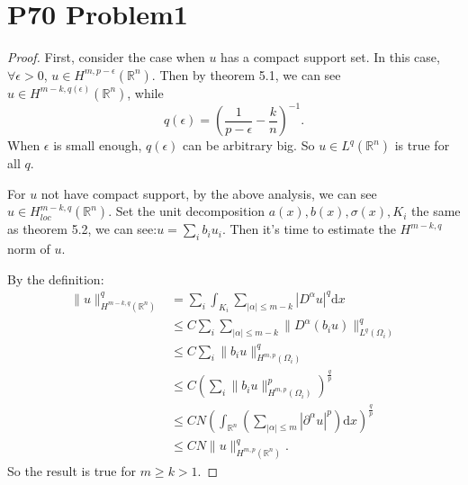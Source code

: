 \documentclass[a4paper]{ctexart}
\newcommand{\dif}{\mathrm{d}}
\begin{document}
\section*{P70 Problem1}
\begin{proof}
    First, consider the case when $u$ has a compact support set. In this case, $\forall\epsilon>0$, $u\in H^{m,p-\epsilon}(\mathbb{R}^{n})$. Then by theorem 5.1, we can see $u\in H^{m-k,q(\epsilon)}(\mathbb{R}^{n})$, while
    \begin{equation}
            q(\epsilon)=(\frac{1}{p-\epsilon}-\frac{k}{n})^{-1}.
    \end{equation}
    When $\epsilon$ is small enough, $q(\epsilon)$ can be arbitrary big. So $u\in L^{q}(\mathbb{R}^{n})$ is true for all $q$.

    For $u$ not have compact support, by the above analysis, we can see $u\in H^{m-k,q}_{loc}(\mathbb{R}^{n})$. Set the unit decomposition $a(x),b(x),\sigma(x),K_{i}$ the same as theorem 5.2, we can see:$u=\sum_{i}b_{i}u_{i}$. Then it's time to estimate the $H^{m-k,q}$ norm of $u$.

    By the definition:
    \begin{equation}
        \begin{aligned}
            \|u\|_{H^{m-k,q}(\mathbb{R}^{n})}^q&=\sum_{i}\int_{K_{i}}\sum_{|\alpha|\le m-k}|D^{\alpha}u|^{q}\dif x\\
            &\le C\sum_{i}\sum_{|\alpha|\le m-k}\|D^{\alpha}(b_{i}u)\|_{L^{q}(\Omega_{i})}^{q}\\
            &\le C\sum_{i}\|b_{i}u\|_{H^{m,p}(\Omega_{i})}^{q}\\
            &\le C\left(\sum_{i}\|b_{i}u\|_{H^{m,p}(\Omega_{i})}^{p}\right)^{\frac{q}{p}}\\
            &\le CN\left(\int_{\mathbb{R}^{n}}\left(\sum_{|\alpha|\le m}|\partial^{\alpha}u|^{p}\right)\dif x\right)^{\frac{q}{p}}\\
            &\le CN\|u\|_{H^{m,p}(\mathbb{R}^{n})}^{q}.
        \end{aligned}
    \end{equation}
    So the result is true for $m\ge k>1$.
\end{proof}
\end{document}
